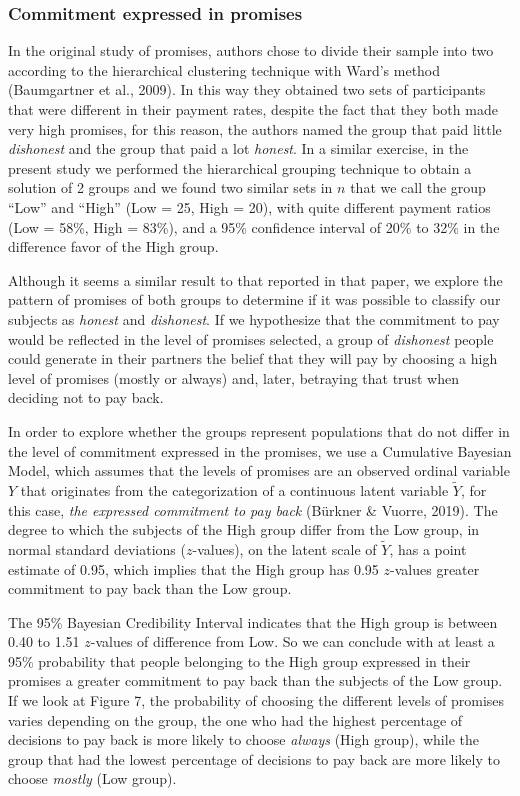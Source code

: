 \documentclass[12pt,]{article}
\begin{document}
\hypertarget{commitment-expressed-in-promises}{%
\subsubsection{Commitment expressed in
promises}\label{commitment-expressed-in-promises}}

In the original study of promises, authors chose to divide their sample
into two according to the hierarchical clustering technique with Ward's
method (Baumgartner et al., 2009). In this way they obtained two sets of
participants that were different in their payment rates, despite the
fact that they both made very high promises, for this reason, the
authors named the group that paid little \emph{dishonest} and the group
that paid a lot \emph{honest}. In a similar exercise, in the present
study we performed the hierarchical grouping technique to obtain a
solution of 2 groups and we found two similar sets in \(n\) that we call
the group ``Low'' and ``High'' (Low = 25, High = 20), with quite
different payment ratios (Low = 58\%, High = 83\%), and a 95\%
confidence interval of 20\% to 32\% in the difference favor of the High
group.

Although it seems a similar result to that reported in that paper, we
explore the pattern of promises of both groups to determine if it was
possible to classify our subjects as \emph{honest} and \emph{dishonest}.
If we hypothesize that the commitment to pay would be reflected in the
level of promises selected, a group of \emph{dishonest} people could
generate in their partners the belief that they will pay by choosing a
high level of promises (mostly or always) and, later, betraying that
trust when deciding not to pay back.

In order to explore whether the groups represent populations that do not
differ in the level of commitment expressed in the promises, we use a
Cumulative Bayesian Model, which assumes that the levels of promises are
an observed ordinal variable \(Y\) that originates from the
categorization of a continuous latent variable \(\tilde{Y}\), for this
case, \emph{the expressed commitment to pay back} (Bürkner \& Vuorre,
2019). The degree to which the subjects of the High group differ from
the Low group, in normal standard deviations (\(z\)-values), on the
latent scale of \(\tilde{Y}\), has a point estimate of 0.95, which
implies that the High group has 0.95 \(z\)-values greater commitment to
pay back than the Low group.

The 95\% Bayesian Credibility Interval indicates that the High group is
between 0.40 to 1.51 \(z\)-values of difference from Low. So we can
conclude with at least a 95\% probability that people belonging to the
High group expressed in their promises a greater commitment to pay back
than the subjects of the Low group. If we look at Figure 7, the
probability of choosing the different levels of promises varies
depending on the group, the one who had the highest percentage of
decisions to pay back is more likely to choose \emph{always} (High
group), while the group that had the lowest percentage of decisions to
pay back are more likely to choose \emph{mostly} (Low group).
\end{document}
